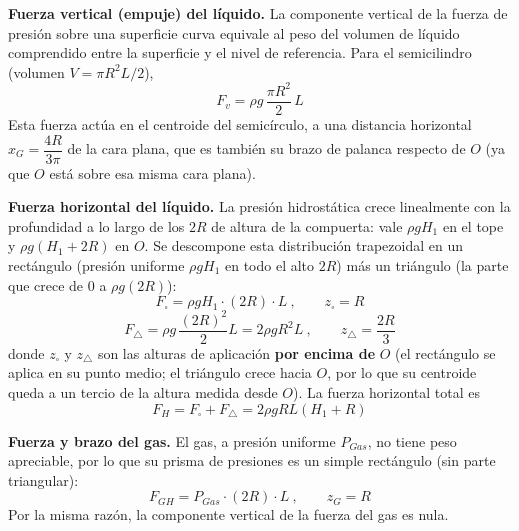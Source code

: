 \documentclass[11pt]{article}
\begin{document}
\textbf{Fuerza vertical (empuje) del l\'iquido.} La componente vertical de la fuerza de
presi\'on sobre una superficie curva equivale al peso del volumen de l\'iquido
comprendido entre la superficie y el nivel de referencia. Para el semicilindro (volumen
$V=\pi R^2L/2$),
\begin{equation}
\boxed{F_v=\rho g\,\frac{\pi R^2}{2}\,L}
\end{equation}
Esta fuerza act\'ua en el centroide del semic\'irculo, a una distancia horizontal
$x_G=\dfrac{4R}{3\pi}$ de la cara plana, que es tambi\'en su brazo de palanca respecto
de $O$ (ya que $O$ est\'a sobre esa misma cara plana).

\textbf{Fuerza horizontal del l\'iquido.} La presi\'on hidrost\'atica crece
linealmente con la profundidad a lo largo de los $2R$ de altura de la compuerta: vale
$\rho gH_1$ en el tope y $\rho g(H_1+2R)$ en $O$. Se descompone esta distribuci\'on
trapezoidal en un rect\'angulo (presi\'on uniforme $\rho gH_1$ en todo el alto $2R$)
m\'as un tri\'angulo (la parte que crece de 0 a $\rho g(2R)$):
\begin{equation}
F_\square=\rho gH_1\cdot(2R)\cdot L\ ,\qquad z_\square=R
\end{equation}
\begin{equation}
F_\triangle=\rho g\,\frac{(2R)^2}{2}L=2\rho gR^2L\ ,\qquad z_\triangle=\frac{2R}{3}
\end{equation}
donde $z_\square$ y $z_\triangle$ son las alturas de aplicaci\'on \textbf{por encima
de} $O$ (el rect\'angulo se aplica en su punto medio; el tri\'angulo crece hacia $O$, por
lo que su centroide queda a un tercio de la altura medida desde $O$). La fuerza
horizontal total es
\begin{equation}
F_H=F_\square+F_\triangle=2\rho gRL(H_1+R)
\end{equation}

\textbf{Fuerza y brazo del gas.} El gas, a presi\'on uniforme $P_{Gas}$, no tiene peso
apreciable, por lo que su prisma de presiones es un simple rect\'angulo (sin parte
triangular):
\begin{equation}
F_{GH}=P_{Gas}\cdot(2R)\cdot L\ ,\qquad z_G=R
\end{equation}
Por la misma raz\'on, la componente vertical de la fuerza del gas es nula.
\end{document}

